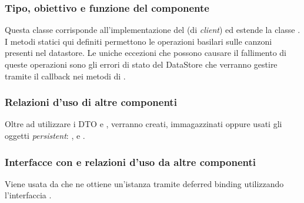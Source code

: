 \subsubsection*{Tipo, obiettivo e funzione del componente}
Questa classe corrisponde all'implementazione del  (di
\emph{client}) ed estende la classe . I metodi statici
qui definiti permettono le operazioni basilari sulle canzoni presenti nel
datastore. Le uniche eccezioni che possono causare il fallimento di queste
operazioni sono gli errori di stato del DataStore  che
verranno gestire tramite il callback nei metodi di .
\subsubsection*{Relazioni d'uso di altre componenti} Oltre ad utilizzare i DTO
 e , verranno creati, immagazzinati oppure usati
gli oggetti \emph{persistent}: ,  e .
\subsubsection*{Interfacce con e relazioni d'uso da altre componenti} Viene
usata da  che ne ottiene un'istanza tramite deferred
binding utilizzando l'interfaccia . 
